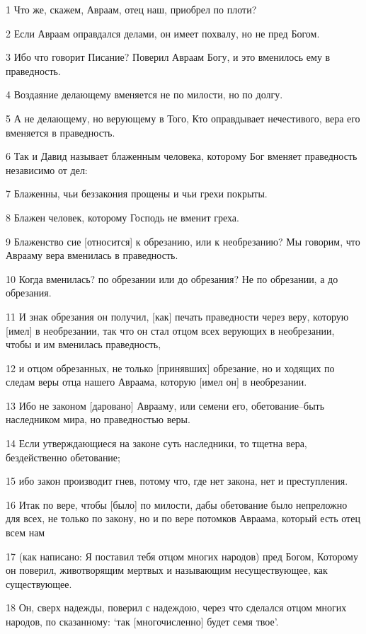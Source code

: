 \par 1 Что же, скажем, Авраам, отец наш, приобрел по плоти?
\par 2 Если Авраам оправдался делами, он имеет похвалу, но не пред Богом.
\par 3 Ибо что говорит Писание? Поверил Авраам Богу, и это вменилось ему в праведность.
\par 4 Воздаяние делающему вменяется не по милости, но по долгу.
\par 5 А не делающему, но верующему в Того, Кто оправдывает нечестивого, вера его вменяется в праведность.
\par 6 Так и Давид называет блаженным человека, которому Бог вменяет праведность независимо от дел:
\par 7 Блаженны, чьи беззакония прощены и чьи грехи покрыты.
\par 8 Блажен человек, которому Господь не вменит греха.
\par 9 Блаженство сие [относится] к обрезанию, или к необрезанию? Мы говорим, что Аврааму вера вменилась в праведность.
\par 10 Когда вменилась? по обрезании или до обрезания? Не по обрезании, а до обрезания.
\par 11 И знак обрезания он получил, [как] печать праведности через веру, которую [имел] в необрезании, так что он стал отцом всех верующих в необрезании, чтобы и им вменилась праведность,
\par 12 и отцом обрезанных, не только [принявших] обрезание, но и ходящих по следам веры отца нашего Авраама, которую [имел он] в необрезании.
\par 13 Ибо не законом [даровано] Аврааму, или семени его, обетование--быть наследником мира, но праведностью веры.
\par 14 Если утверждающиеся на законе суть наследники, то тщетна вера, бездейственно обетование;
\par 15 ибо закон производит гнев, потому что, где нет закона, нет и преступления.
\par 16 Итак по вере, чтобы [было] по милости, дабы обетование было непреложно для всех, не только по закону, но и по вере потомков Авраама, который есть отец всем нам
\par 17 (как написано: Я поставил тебя отцом многих народов) пред Богом, Которому он поверил, животворящим мертвых и называющим несуществующее, как существующее.
\par 18 Он, сверх надежды, поверил с надеждою, через что сделался отцом многих народов, по сказанному: `так [многочисленно] будет семя твое'.
